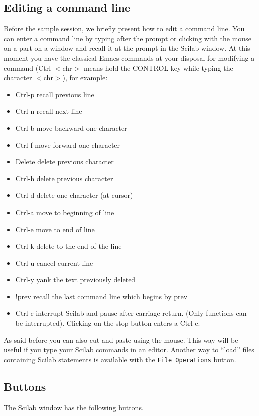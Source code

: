 \subsection{Editing a command line}

Before the sample session, we briefly present how to edit a command line.
You can enter a command line by typing after the prompt or clicking with the 
mouse on a part on a window and recall it at the prompt in the Scilab
window. At this moment you have the classical Emacs commands at your 
disposal for modifying a command (Ctrl-$<$chr$>$  means hold the CONTROL key 
while typing the character $<$chr$>$), for example:

\bigskip


%
\begin{itemize}
	\item Ctrl-p 	recall previous line
	\item Ctrl-n  	recall next line
	\item Ctrl-b  	move backward one character
	\item Ctrl-f  	move forward one character
	\item Delete  	delete previous character
	\item Ctrl-h  	delete previous character
	\item Ctrl-d  	delete one character (at cursor)
	\item Ctrl-a  	move to beginning of line
	\item Ctrl-e  	move to end of line
	\item Ctrl-k  	delete to the end of the line
	\item Ctrl-u  	cancel current line
	\item Ctrl-y  	yank the text previously deleted
	\item !prev   	recall the last command line which begins by prev
	\item Ctrl-c  	interrupt Scilab and pause after carriage return. 
	(Only functions can be interrupted). Clicking on the stop 
	button enters a Ctrl-c.
\end{itemize}
%

As said before you can also cut and paste using the mouse. This way will be
useful if you type your Scilab  commands in an editor. Another way to ``load'' files
containing Scilab statements
is available with the {\tt File Operations} button.

\subsection{Buttons}
The Scilab window has the following buttons.\\

